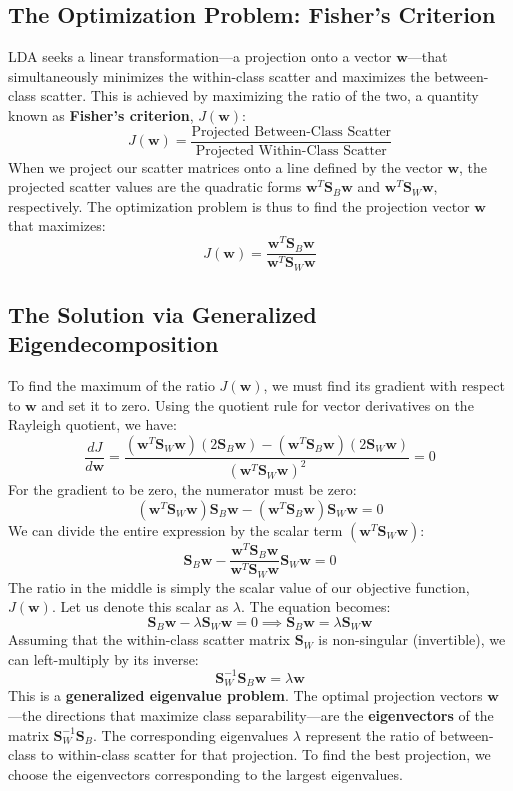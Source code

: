 \begin{enumerate}
\subsection{The Optimization Problem: Fisher's Criterion}
\label{subsec:lda_optimization}
LDA seeks a linear transformation—a projection onto a vector $\mathbf{w}$—that simultaneously minimizes the within-class scatter and maximizes the between-class scatter. This is achieved by maximizing the ratio of the two, a quantity known as \textbf{Fisher's criterion}, $J(\mathbf{w})$:
$$ J(\mathbf{w}) = \frac{\text{Projected Between-Class Scatter}}{\text{Projected Within-Class Scatter}} $$
When we project our scatter matrices onto a line defined by the vector $\mathbf{w}$, the projected scatter values are the quadratic forms $\mathbf{w}^T \mathbf{S}_B \mathbf{w}$ and $\mathbf{w}^T \mathbf{S}_W \mathbf{w}$, respectively. The optimization problem is thus to find the projection vector $\mathbf{w}$ that maximizes:
$$ J(\mathbf{w}) = \frac{\mathbf{w}^T \mathbf{S}_B \mathbf{w}}{\mathbf{w}^T \mathbf{S}_W \mathbf{w}} $$

\subsection{The Solution via Generalized Eigendecomposition}
\label{subsec:lda_solution}
To find the maximum of the ratio $J(\mathbf{w})$, we must find its gradient with respect to $\mathbf{w}$ and set it to zero. Using the quotient rule for vector derivatives on the Rayleigh quotient, we have:
$$ \frac{dJ}{d\mathbf{w}} = \frac{(\mathbf{w}^T \mathbf{S}_W \mathbf{w})(2\mathbf{S}_B \mathbf{w}) - (\mathbf{w}^T \mathbf{S}_B \mathbf{w})(2\mathbf{S}_W \mathbf{w})}{(\mathbf{w}^T \mathbf{S}_W \mathbf{w})^2} = 0 $$
For the gradient to be zero, the numerator must be zero:
$$ (\mathbf{w}^T \mathbf{S}_W \mathbf{w})\mathbf{S}_B \mathbf{w} - (\mathbf{w}^T \mathbf{S}_B \mathbf{w})\mathbf{S}_W \mathbf{w} = 0 $$
We can divide the entire expression by the scalar term $(\mathbf{w}^T \mathbf{S}_W \mathbf{w})$:
$$ \mathbf{S}_B \mathbf{w} - \frac{\mathbf{w}^T \mathbf{S}_B \mathbf{w}}{\mathbf{w}^T \mathbf{S}_W \mathbf{w}} \mathbf{S}_W \mathbf{w} = 0 $$
The ratio in the middle is simply the scalar value of our objective function, $J(\mathbf{w})$. Let us denote this scalar as $\lambda$. The equation becomes:
$$ \mathbf{S}_B \mathbf{w} - \lambda \mathbf{S}_W \mathbf{w} = 0 \implies \mathbf{S}_B \mathbf{w} = \lambda \mathbf{S}_W \mathbf{w} $$
Assuming that the within-class scatter matrix $\mathbf{S}_W$ is non-singular (invertible), we can left-multiply by its inverse:
$$ \mathbf{S}_W^{-1}\mathbf{S}_B \mathbf{w} = \lambda \mathbf{w} $$
This is a \textbf{generalized eigenvalue problem}. The optimal projection vectors $\mathbf{w}$—the directions that maximize class separability—are the \textbf{eigenvectors} of the matrix $\mathbf{S}_W^{-1}\mathbf{S}_B$. The corresponding eigenvalues $\lambda$ represent the ratio of between-class to within-class scatter for that projection. To find the best projection, we choose the eigenvectors corresponding to the largest eigenvalues.


\end{enumerate}
